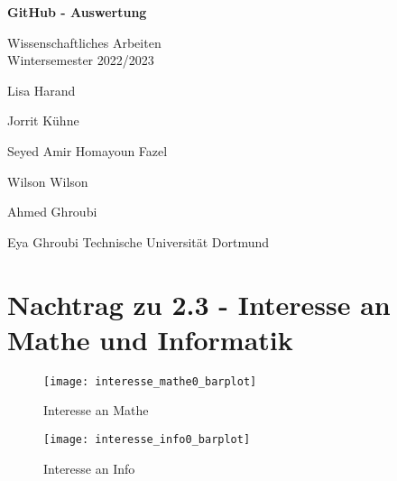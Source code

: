 \documentclass[paper=a4,                 %
               fontsize=12pt,            %
               parskip=half,             %
               ngerman,                 %
               ]{scrartcl}
\begin{document}
\begin{titlepage}
    \begin{center}
        \vspace*{3cm}
            
        \Huge
        \textbf{GitHub - Auswertung}
            
        \vspace{0.5cm}
        \LARGE
        Wissenschaftliches Arbeiten\\ 
        \Large
        Wintersemester 2022/2023
        \vspace{2cm}      
           
        Lisa Harand 
        
		Jorrit Kühne
		
		Seyed Amir Homayoun Fazel 
		
		Wilson Wilson
		
		Ahmed Ghroubi 
		
		Eya Ghroubi 
        \vfill    
        \vspace{0.8cm} 
        \Large
        Technische Universität Dortmund\\
            
    \end{center}
\end{titlepage}
\section*{Nachtrag zu 2.3 - Interesse an Mathe und Informatik}
\begin{figure}[h]
\begin{center}
      \texttt{[image: interesse\_mathe0\_barplot]}
      \caption{Interesse an Mathe}
	\texttt{[image: interesse\_info0\_barplot]}
	\caption{Interesse an Info}
\end{center}
\end{figure}
\end{document}
